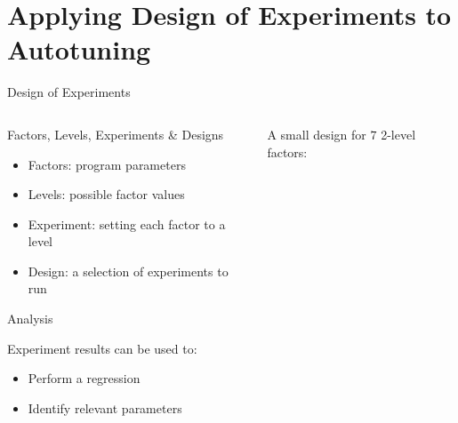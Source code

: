 \documentclass[10pt, compress, aspectratio=169, xcolor={table,usenames,dvipsnames}]{beamer}
\begin{document}
\section{Applying Design of Experiments to Autotuning}
\label{sec:org8f3936c}
\begin{frame}[label={sec:orgd55243c}]{Design of Experiments}
\begin{columns}
\begin{column}{0.5\columnwidth}
\begin{block}{Factors, Levels, Experiments \& Designs}
\vspace{.2cm}

\begin{itemize}
\item \alert{Factors}: program \alert{parameters}
\item \alert{Levels}: possible factor \alert{values}
\item \alert{Experiment}: setting each factor to a level
\item \alert{Design}: a \alert{selection} of experiments to \alert{run}
\end{itemize}

\begin{block}{Analysis}
\vspace{.2cm}

\alert{Experiment results} can be used to:

\begin{itemize}
\item Perform a \alert{regression}
\item Identify \alert{relevant parameters}
\end{itemize}
\end{block}
\end{block}
\end{column}

\begin{column}{0.5\columnwidth}
\vspace{.4cm}

A \alert{small design} for \(7\) \alert{2-level factors}:

\vspace{.2cm}


\end{column}
\end{columns}
\end{frame}
\end{document}
